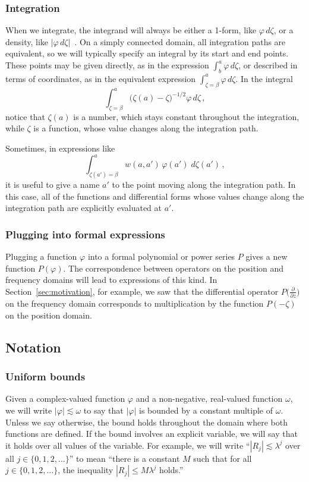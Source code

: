 \documentclass[final]{siamart220329}
\newenvironment{revtwo}{\color{revred}}{\color{black}}
\newenvironment{revtwo}{}{}
\begin{document}
\subsubsection{Integration}
When we integrate, the integrand will always be either a 1-form, like $\varphi\,d\zeta$, or a density, like $|\varphi\,d\zeta|$~\cite[Section~1.8]{local-viewpoint}. On a simply connected domain, all integration paths are equivalent, so we will typically specify an integral by its start and end points. These points may be given directly, as in the expression $\int_b^a \varphi\,d\zeta$, or described in terms of coordinates, as in the equivalent expression $\int_{\zeta = \beta}^a \varphi\,d\zeta$. In the integral
\[ \int_{\zeta = \beta}^a \big(\zeta(a) - \zeta\big)^{-1/2} \varphi\,d\zeta\,, \]
notice that $\zeta(a)$ is a number, which stays constant throughout the integration, while $\zeta$ is a function, whose value changes along the integration path.

\begin{revtwo}
Sometimes, in expressions like
\[ \int_{\zeta(a') = \beta}^a w(a, a')\,\varphi(a')\;d\zeta(a')\,, \]
it is useful to give a name $a'$ to the point moving along the integration path. In this case, all of the functions and differential forms whose values change along the integration path are explicitly evaluated at $a'$.
\end{revtwo}
\subsubsection{Plugging into formal expressions}
Plugging a function $\varphi$ into a formal polynomial or power series $P$ gives a new function $P(\varphi)$. The correspondence between operators on the position and frequency domains will lead to expressions of this kind. In Section~\ref{sec:motivation}, for example, we saw that the differential operator $P\big(\tfrac{\partial}{\partial z}\big)$ on the frequency domain corresponds to multiplication by the function $P(-\zeta)$ on the position domain.
\subsection{Notation}
\subsubsection{Uniform bounds}
Given a complex-valued function $\varphi$ and a non-negative, real-valued function $\omega$, we will write $|\varphi| \lesssim \omega$ to say that $|\varphi|$ is bounded by a constant multiple of $\omega$. Unless we say otherwise, the bound holds throughout the domain where both functions are defined. If the bound involves an explicit variable, we will say that it holds over all values of the variable. For example, we will write ``$|R_j| \lesssim \lambda^j$ over all $j \in \{0, 1, 2, \ldots\}$'' to mean ``there is a constant $M$ such that for all $j \in \{0, 1, 2, \ldots\}$, the inequality $|R_j| \le M \lambda^j$ holds.''
\end{document}
